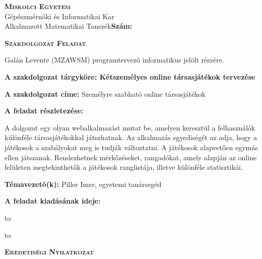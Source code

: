 \begin{flushleft}
	\textsc{\bfseries Miskolci Egyetem}\\
	Gépészmérnöki és Informatikai Kar\\
	Alkalmazott Matematikai Tanszék\hspace*{4cm}\hfil \textbf{Szám:}
\end{flushleft}
\vskip 0.5cm
\begin{center}
	\large\textsc{\bfseries Szakdolgozat Feladat}
\end{center}
\vskip 0.5cm
Galán Levente (MZAWSM) programtervezõ informatikus jelölt részére.\newline

\noindent\textbf{A szakdolgozat tárgyköre: Kétszemélyes online társasjátékok tervezése} \newline

\noindent\textbf{A szakdolgozat címe:} Személyre szabható online társasjátékok \newline

\noindent\textbf{A feladat részletezése:}

\noindent A dolgozat egy olyan webalkalmazást mutat be, amelyen keresztül a felhasználók különféle társasjátékokkal játszhatnak.
\noindent Az alkalmazás egyediségét az adja, hogy a játékosok a szabályokat meg is tudják változtatni.
\noindent A játékosok alapvetően egymás ellen játszanak.
\noindent Rendezhetnek mérkőzéseket, rangadókat, amely alapján az online felületen megtekinthetők a játékosok ranglistája, illetve különféle statisztikái.

\vfill

\noindent\textbf{Témavezetõ(k):} Piller Imre, egyetemi tanársegéd\newline

\noindent\textbf{A feladat kiadásának ideje:}\newline


\vskip 2cm

\hbox to 

\hbox to 


\newpage

\vspace*{1cm}  
\begin{center}
\large\textsc{\bfseries Eredetiségi Nyilatkozat}
\end{center}
\vspace*{2cm}

